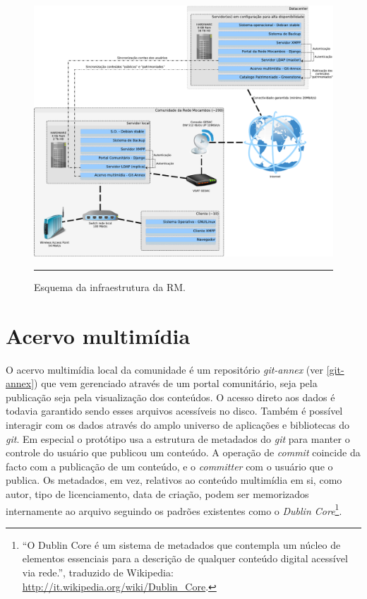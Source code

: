 \begin{figure}[htbp]
  \centering
  \includegraphics[width=\textwidth]{./Figure/SchemaServer_ReteMocambos-crop.pdf}
  \rule{35em}{0.5pt}
  \caption[Esquema da infraestrutura da RM]{Esquema da infraestrutura da RM.}
  \label{fig:SchemaServer_ReteMocambos}
\end{figure}

\section{Acervo multimídia}
O acervo multimídia local da comunidade é um repositório
\emph{git-annex} (ver \ref{git-annex}) que vem gerenciado através de
um portal comunitário, seja pela publicação seja pela visualização dos
conteúdos. O acesso direto aos dados é todavia garantido sendo esses
arquivos acessíveis no disco. Também é possível interagir com os dados
através do amplo universo de aplicações e bibliotecas do
\emph{git}. Em especial o protótipo usa a estrutura de metadados do
\emph{git} para manter o controle do usuário que publicou um
conteúdo. A operação de \emph{commit} coincide da facto com a
publicação de um conteúdo, e o \emph{committer} com o usuário que o
publica. Os metadados, em vez, relativos ao conteúdo multimídia em si,
como autor, tipo de licenciamento, data de criação, podem ser
memorizados internamente ao arquivo seguindo os padrões existentes
como o \emph{Dublin Core}\footnote{``O Dublin Core é um sistema de
  metadados que contempla um núcleo de elementos essenciais para a
  descrição de qualquer conteúdo digital acessível via rede.'',
  traduzido de Wikipedia:
  \url{http://it.wikipedia.org/wiki/Dublin_Core}.}.

